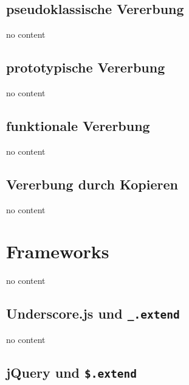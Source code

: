 \subsection{pseudoklassische Vererbung}

\begin{frame}
  no content
\end{frame}

\subsection{prototypische Vererbung}

\begin{frame}
  no content
\end{frame}

\subsection{funktionale Vererbung}

\begin{frame}
  no content
\end{frame}

\subsection{Vererbung durch Kopieren}

\begin{frame}
  no content
\end{frame}

\section{Frameworks}

\begin{frame}
  no content
\end{frame}

\subsection{Underscore.js und \texttt{\_.extend}}

\begin{frame}
  no content
\end{frame}

\subsection{jQuery und \texttt{\$.extend}}

